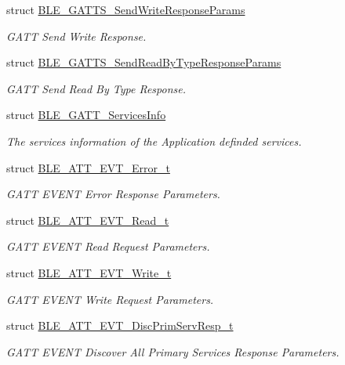 \begin{DoxyCompactItemize}
struct \hyperlink{struct_b_l_e___g_a_t_t_s___send_write_response_params}{B\+L\+E\+\_\+\+G\+A\+T\+T\+S\+\_\+\+Send\+Write\+Response\+Params}
\begin{DoxyCompactList}\small\item\em G\+A\+TT Send Write Response. \end{DoxyCompactList}\item 
struct \hyperlink{struct_b_l_e___g_a_t_t_s___send_read_by_type_response_params}{B\+L\+E\+\_\+\+G\+A\+T\+T\+S\+\_\+\+Send\+Read\+By\+Type\+Response\+Params}
\begin{DoxyCompactList}\small\item\em G\+A\+TT Send Read By Type Response. \end{DoxyCompactList}\item 
struct \hyperlink{struct_b_l_e___g_a_t_t___services_info}{B\+L\+E\+\_\+\+G\+A\+T\+T\+\_\+\+Services\+Info}
\begin{DoxyCompactList}\small\item\em The services information of the Application definded services. \end{DoxyCompactList}\item 
struct \hyperlink{struct_b_l_e___a_t_t___e_v_t___error__t}{B\+L\+E\+\_\+\+A\+T\+T\+\_\+\+E\+V\+T\+\_\+\+Error\+\_\+t}
\begin{DoxyCompactList}\small\item\em G\+A\+TT E\+V\+E\+NT Error Response Parameters. \end{DoxyCompactList}\item 
struct \hyperlink{struct_b_l_e___a_t_t___e_v_t___read__t}{B\+L\+E\+\_\+\+A\+T\+T\+\_\+\+E\+V\+T\+\_\+\+Read\+\_\+t}
\begin{DoxyCompactList}\small\item\em G\+A\+TT E\+V\+E\+NT Read Request Parameters. \end{DoxyCompactList}\item 
struct \hyperlink{struct_b_l_e___a_t_t___e_v_t___write__t}{B\+L\+E\+\_\+\+A\+T\+T\+\_\+\+E\+V\+T\+\_\+\+Write\+\_\+t}
\begin{DoxyCompactList}\small\item\em G\+A\+TT E\+V\+E\+NT Write Request Parameters. \end{DoxyCompactList}\item 
struct \hyperlink{struct_b_l_e___a_t_t___e_v_t___disc_prim_serv_resp__t}{B\+L\+E\+\_\+\+A\+T\+T\+\_\+\+E\+V\+T\+\_\+\+Disc\+Prim\+Serv\+Resp\+\_\+t}
\begin{DoxyCompactList}\small\item\em G\+A\+TT E\+V\+E\+NT Discover All Primary Services Response Parameters. \end{DoxyCompactList}\item 

\end{DoxyCompactItemize}
